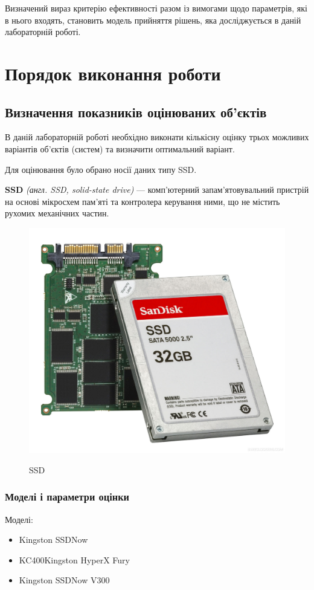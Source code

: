 Визначений вираз критерію ефективності разом із вимогами щодо параметрів, які в нього входять,
становить модель прийняття рішень, яка досліджується в даній лабораторній роботі.

\section{Порядок виконання роботи}

\subsection{Визначення показників оцінюваних об’єктів}

В даній лабораторній роботі необхідно виконати кількісну оцінку трьох можливих варіантів об’єктів
(систем) та визначити оптимальний варіант.

Для оцінювання було обрано носії даних типу SSD.

\textbf{SSD} \textit{(англ. SSD, solid-state drive)} --- комп'ютерний запам'ятовувальний пристрій на
основі мікросхем пам'яті та контролера керування ними, що не містить рухомих механічних частин.
\begin{figure}[!ht]
  \centering
  \includegraphics[width=0.7\linewidth]{images/lab1/ssd.jpg}
  \label{f:ssd} 
  \caption{SSD}
\end{figure}

\subsubsection{Моделі і параметри оцінки}

Моделі:
\begin{itemize}
\item Kingston SSDNow
\item KC400Kingston HyperX Fury
\item Kingston SSDNow V300
\end{itemize}

